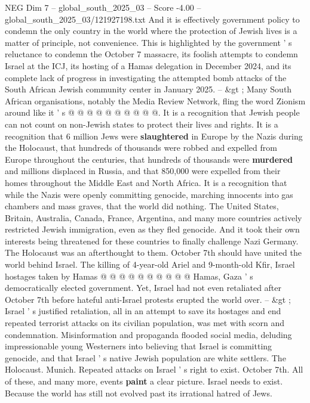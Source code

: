 \begin{textsample}{NEG Dim 7 – global\_south\_2025\_03 – Score -4.00 – global\_south\_2025\_03/121927198.txt}
And it is effectively government policy to condemn the only country in the world where the protection of Jewish lives is a matter of principle, not convenience.
This is highlighted by the government ' s reluctance to condemn the October 7 massacre, its foolish attempts to condemn Israel at the ICJ, its hosting of a Hamas delegation in December 2024, and its complete lack of progress in investigating the attempted bomb attacks of the South African Jewish community center in January 2025. -- \&gt ; Many South African organisations, notably the Media Review Network, fling the word Zionism around like it ' s @ @ @ @ @ @ @ @ @ @.
It is a recognition that Jewish people can not count on non-Jewish states to protect their lives and rights.
It is a recognition that 6 million Jews were \textbf{slaughtered} in Europe by the Nazis during the Holocaust, that hundreds of thousands were robbed and expelled from Europe throughout the centuries, that hundreds of thousands were \textbf{murdered} and millions displaced in Russia, and that 850,000 were expelled from their homes throughout the Middle East and North Africa.
It is a recognition that while the Nazis were openly committing genocide, marching innocents into gas chambers and mass graves, that the world did nothing.
The United States, Britain, Australia, Canada, France, Argentina, and many more countries actively restricted Jewish immigration, even as they fled genocide.
And it took their own interests being threatened for these countries to finally challenge Nazi Germany.
The Holocaust was an afterthought to them.
October 7th should have united the world behind Israel.
The killing of 4-year-old Ariel and 9-month-old Kfir, Israel hostages taken by Hamas @ @ @ @ @ @ @ @ @ @ Hamas, Gaza ' s democratically elected government.
Yet, Israel had not even retaliated after October 7th before hateful anti-Israel protests erupted the world over. -- \&gt ; Israel ' s justified retaliation, all in an attempt to save its hostages and end repeated terrorist attacks on its civilian population, was met with scorn and condemnation.
Misinformation and propaganda flooded social media, deluding impressionable young Westerners into believing that Israel is committing genocide, and that Israel ' s native Jewish population are white settlers.
The Holocaust.
Munich.
Repeated attacks on Israel ' s right to exist.
October 7th.
All of these, and many more, events \textbf{paint} a clear picture.
Israel needs to exist.
Because the world has still not evolved past its irrational hatred of Jews.

\end{textsample}
